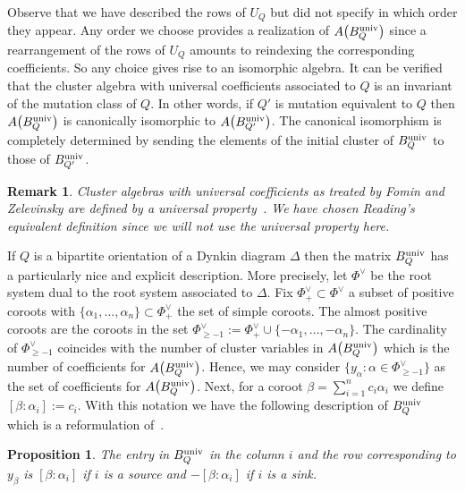 \documentclass[10pt,a4paper]{amsart}
\newcommand{\thlabel}[1]{\label{#1}}
\newtheorem{Proposition}[Theorem]{Proposition}
\newtheorem{Remark}[Theorem]{Remark}}
\numberwithin{equation}{section}
\begin{document}
Observe that we have described the rows of $U_Q$ but did not specify in which order they appear.
Any order we choose provides a realization of $A\big(B_Q^{{\rm univ}}\big)$ since a rearrangement of the rows of $U_Q$ amounts to reindexing the corresponding coefficients. So any choice gives rise to an isomorphic algebra.
It can be verified that the cluster algebra with universal coefficients associated to $Q$ is an invariant of the mutation class of $Q$. In other words, if $Q'$ is mutation equivalent to $Q$ then $A\big(B_Q^{{\rm univ}}\big)$ is canonically isomorphic to $A\big(B_{Q'}^{{\rm univ}}\big)$. The canonical isomorphism is completely determined by sending the elements of the initial cluster of $B_{Q}^{{\rm univ}}$ to those of $B_{Q'}^{{\rm univ}}$.

\begin{Remark}
\thlabel{rem:univ_property}
Cluster algebras with universal coefficients as treated by Fomin and Zelevinsky are defined by a universal property~\cite[Definition~12.1]{FZ_clustersIV}. We have chosen Reading's equivalent definition since we will not use the universal property here.
\end{Remark}

If $Q$ is a bipartite orientation of a Dynkin diagram $\Delta$ then the matrix $B^{\rm univ}_Q$ has a particularly nice and explicit description.
More precisely, let $\Phi^{\vee}$ be the root system dual to the root system associated to $\Delta$. Fix $\Phi^{\vee}_+\subset \Phi^{\vee}$ a subset of positive coroots with $\{ \alpha_1, \dots , \alpha_n \} \subset \Phi^{\vee}_+$ the set of simple coroots.
The almost positive coroots are the coroots in the set $\Phi^{\vee}_{\geq -1}:= \Phi^{\vee}_+ \cup \{ -\alpha_1, \dots , -\alpha_n \}$.
The cardinality of $\Phi^{\vee}_{\geq -1}$ coincides with the number of cluster variables in $A\big(B^{\rm univ}_{Q}\big)$ which is the number of coefficients for $A\big(B^{\rm univ}_{Q}\big)$.
Hence, we may consider $\big\{ y_{\alpha} \colon \alpha \in \Phi^{\vee}_{\geq -1} \big\} $ as the set of coefficients for $A\big(B^{\rm univ}_{Q}\big)$.
Next, for a coroot $\beta = \sum_{i=1}^n c_i \alpha_i$ we define $[\beta: \alpha_i]:=c_i$. With this notation we have the following description of $ B^{\rm univ}_Q $ which is a reformulation of~\cite[Theorem~12.4]{FZ_clustersIV}.


\begin{Proposition}
\thlabel{prop:bipartite_univ_Q}
The entry in $B_Q^{\rm univ}$ in the column $i $ and the row corresponding to $y_{\beta} $ is $[\beta : \alpha_i]$ if $i$ is a source and $-[\beta : \alpha_i]$ if $i$ is a sink.
\end{Proposition}
\end{document}
